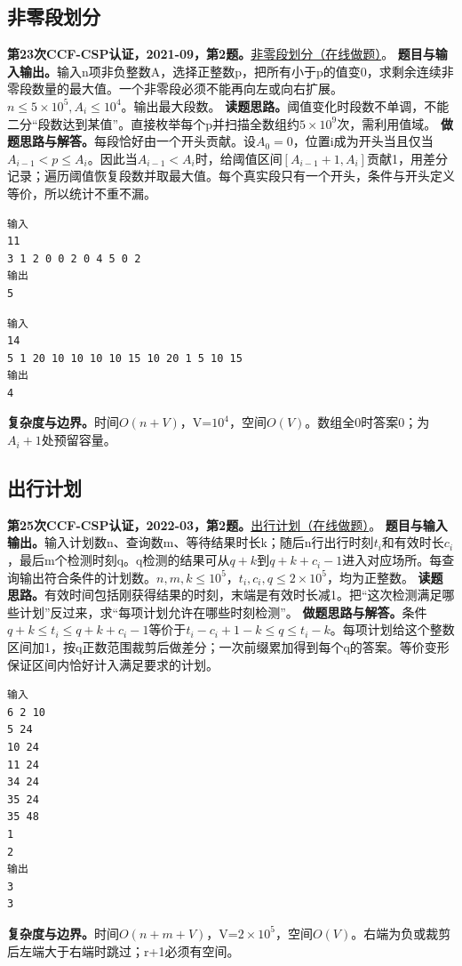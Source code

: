 \subsection{非零段划分}
\textbf{第23次CCF-CSP认证，2021-09，第2题。}\href{https://www.acwing.com/problem/content/4010/}{非零段划分（在线做题）}。
\textbf{题目与输入输出。}输入n项非负整数A，选择正整数p，把所有小于p的值变0，求剩余连续非零段数量的最大值。一个非零段必须不能再向左或向右扩展。$n\le5\times10^5,A_i\le10^4$。输出最大段数。
\textbf{读题思路。}阈值变化时段数不单调，不能二分“段数达到某值”。直接枚举每个p并扫描全数组约$5\times10^9$次，需利用值域。
\textbf{做题思路与解答。}每段恰好由一个开头贡献。设$A_0=0$，位置i成为开头当且仅当$A_{i-1}<p\le A_i$。因此当$A_{i-1}<A_i$时，给阈值区间$[A_{i-1}+1,A_i]$贡献1，用差分记录；遍历阈值恢复段数并取最大值。每个真实段只有一个开头，条件与开头定义等价，所以统计不重不漏。
\begin{verbatim}
输入
11
3 1 2 0 0 2 0 4 5 0 2
输出
5
\end{verbatim}
\begin{verbatim}
输入
14
5 1 20 10 10 10 10 15 10 20 1 5 10 15
输出
4
\end{verbatim}
\textbf{复杂度与边界。}时间$O(n+V)$，V=$10^4$，空间$O(V)$。数组全0时答案0；为$A_i+1$处预留容量。
\subsection{出行计划}
\textbf{第25次CCF-CSP认证，2022-03，第2题。}\href{https://www.acwing.com/problem/content/4458/}{出行计划（在线做题）}。
\textbf{题目与输入输出。}输入计划数n、查询数m、等待结果时长k；随后n行出行时刻$t_i$和有效时长$c_i$，最后m个检测时刻q。q检测的结果可从$q+k$到$q+k+c_i-1$进入对应场所。每查询输出符合条件的计划数。$n,m,k\le10^5$，$t_i,c_i,q\le2\times10^5$，均为正整数。
\textbf{读题思路。}有效时间包括刚获得结果的时刻，末端是有效时长减1。把“这次检测满足哪些计划”反过来，求“每项计划允许在哪些时刻检测”。
\textbf{做题思路与解答。}条件$q+k\le t_i\le q+k+c_i-1$等价于$t_i-c_i+1-k\le q\le t_i-k$。每项计划给这个整数区间加1，按q正数范围裁剪后做差分；一次前缀累加得到每个q的答案。等价变形保证区间内恰好计入满足要求的计划。
\begin{verbatim}
输入
6 2 10
5 24
10 24
11 24
34 24
35 24
35 48
1
2
输出
3
3
\end{verbatim}
\textbf{复杂度与边界。}时间$O(n+m+V)$，V=$2\times10^5$，空间$O(V)$。右端为负或裁剪后左端大于右端时跳过；r+1必须有空间。
